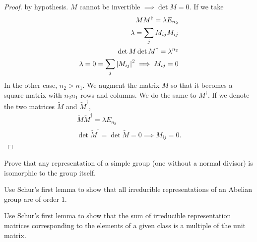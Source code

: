 \begin{proof}
by hypothesis. $M$ cannot be invertible $\implies\det M=0$.
If we take
\begin{align}
    MM^\dagger=\lambda E_{n_2}\\
    \lambda=\sum_j M_{ij}\bar{M}_{ij}\\
    \det M\det M^\dagger=\lambda^{n_2}\\
    \lambda=0=\sum_j\abs{M_{ij}}^2\implies M_{ij}=0
\end{align}
In the other case, $n_2>n_1$. We augment the matrix $M$ so that it becomes a
square matrix with $n_2n_1$ rows and columns. We do the same to $M^\dagger$.
If we denote the two matrices $\widetilde{M}$ and $\widetilde{M}^\dagger$,
\begin{align}
    \widetilde{M}\widetilde{M}^\dagger = \lambda E_{n_2}\\
    \det\widetilde{M}^\dagger=\det\widetilde{M}=0\implies M_{ij}=0.
\end{align}
\end{proof}


\begin{exercise}
    Prove that any representation of a simple group (one without a normal divisor)
    is isomorphic to the group
    itself.
\end{exercise}

\begin{exercise}
    Use Schur's first lemma to show that all irreducible representations of an
    Abelian group are of order $1$.
\end{exercise}

\begin{exercise}
    Use Schur's first lemma to show that the sum of irreducible representation
    matrices corresponding to the elements of a given class is a multiple of the
    unit matrix.
\end{exercise}
